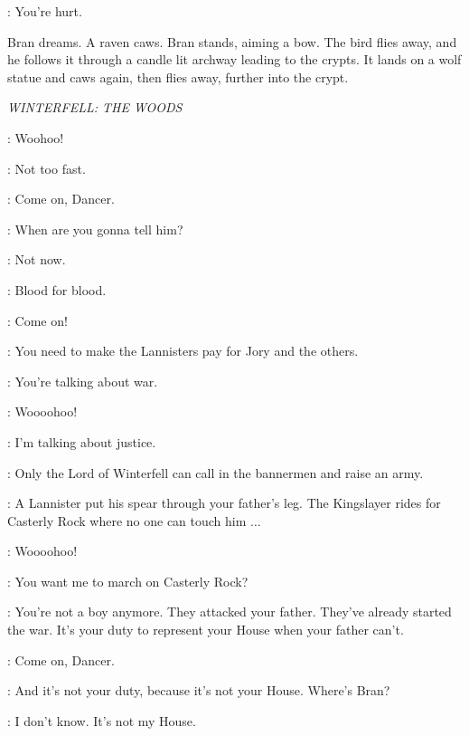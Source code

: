 \DAENERYS: You're hurt. 


\scene

\n Bran dreams. A raven caws. Bran stands, aiming a bow. The bird flies away, and he follows it through a candle lit archway leading to the crypts. It lands on a wolf statue and caws again, then flies away, further into the crypt.

\scene

\textit{WINTERFELL: THE WOODS} 


\BRAN: Woohoo! 

\ROBB: Not too fast. 

\BRAN: Come on, Dancer. 

\THEON: When are you gonna tell him? 

\ROBB: Not now. 

\THEON: Blood for blood. 

\BRAN: Come on! 

\THEON: You need to make the Lannisters pay for Jory and the others. 

\ROBB: You're talking about war. 

\BRAN: Woooohoo! 

\THEON: I'm talking about justice. 

\ROBB: Only the Lord of Winterfell can call in the bannermen and raise an army. 

\THEON: A Lannister put his spear through your father's leg. The Kingslayer rides for Casterly Rock where no one can touch him $\ldots$ 

\BRAN: Woooohoo! 

\ROBB: You want me to march on Casterly Rock? 

\THEON: You're not a boy anymore. They attacked your father. They've already started the war. It's your duty to represent your House when your father can't. 

\BRAN: Come on, Dancer. 


\ROBB: And it's not your duty, because it's not your House. Where's Bran? 

\THEON: I don't know. It's not my House. 


